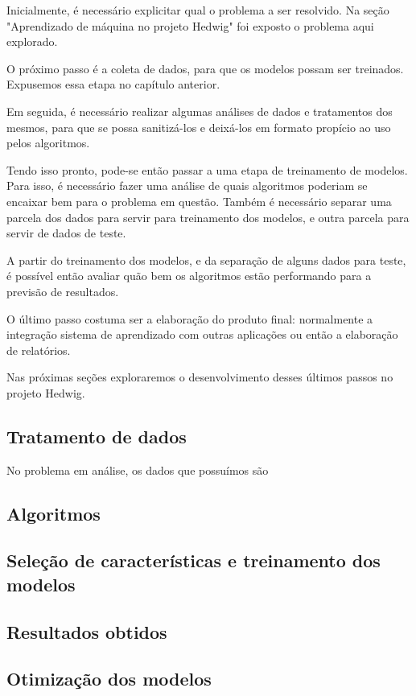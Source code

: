 			Inicialmente, é necessário explicitar qual o problema a ser resolvido. Na seção "Aprendizado de máquina no projeto Hedwig" foi exposto o problema aqui explorado. 

			O próximo passo é a coleta de dados, para que os modelos possam ser treinados. Expusemos essa etapa no capítulo anterior.

			Em seguida, é necessário realizar algumas análises de dados e tratamentos dos mesmos, para que se possa sanitizá-los e deixá-los em formato propício ao uso pelos algoritmos.

			Tendo isso pronto, pode-se então passar a uma etapa de treinamento de modelos. Para isso, é necessário fazer uma análise de quais algoritmos poderiam se encaixar bem para o problema em questão. Também é necessário separar uma parcela dos dados para servir para treinamento dos modelos, e outra parcela para servir de dados de teste.

			A partir do treinamento dos modelos, e da separação de alguns dados para teste, é possível então avaliar quão bem os algoritmos estão performando para a previsão de resultados.

			O último passo costuma ser a elaboração do produto final: normalmente a integração sistema de aprendizado com outras aplicações ou então a elaboração de relatórios.

			Nas próximas seções exploraremos o desenvolvimento desses últimos passos no projeto Hedwig.

		\subsection{Tratamento de dados}

		No problema em análise, os dados que possuímos são

		\subsection{Algoritmos}

		\subsection{Seleção de características e treinamento dos modelos}
		
		\subsection{Resultados obtidos}

		\subsection{Otimização dos modelos}
